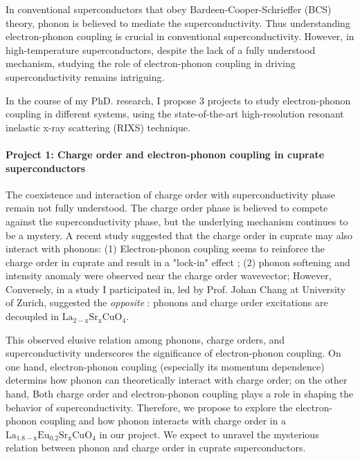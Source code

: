 \documentclass[11pt]{article}
\begin{document}
In conventional superconductors that obey Bardeen-Cooper-Schrieffer (BCS) theory, phonon is believed to mediate the superconductivity\cite{bardeen_theory_1957}. Thus understanding electron-phonon coupling is crucial in conventional superconductivity. However, in high-temperature superconductors, despite the lack of a fully understood mechanism, studying the role of electron-phonon coupling in driving superconductivity remains intriguing.

In the course of my PhD. research, I propose 3 projects to study electron-phonon coupling in different systems, using the state-of-the-art high-resolution resonant inelastic x-ray scattering (RIXS) technique\cite{ament_resonant_2011,zhou_i21_2022}. 

\paragraph{Project 1: Charge order and electron-phonon coupling in cuprate superconductors}
The coexistence and interaction of charge order with superconductivity phase remain not fully understood. The charge order phase is believed to compete against the superconductivity phase\cite{arpaia_charge_2021,comin_resonant_2016,canosa_resonant_2014, hucker_competing_2014, chang_direct_2012,ghiringhelli_long-range_2012}, but the underlying mechanism continues to be a mystery. A recent study suggested that the charge order in cuprate may also interact with phonons: (1) Electron-phonon coupling seems to reinforce the charge order in cuprate and result in a "lock-in" effect \cite{wang_charge_2021}; (2) phonon softening and intensity anomaly were observed near the charge order wavevector\cite{wang_charge_2021,lin_strongly_2020, huang_quantum_2021,miao_incommensurate_2018,tacon_inelastic_2014,li_multiorbital_2020,braicovich_determining_2020,chaix_dispersive_2017,peng_enhanced_2020};  However, Conversely, in a study I participated in, led by Prof. Johan Chang at University of Zurich, suggested the \textit{opposite} : phonons and charge order excitations are decoupled in $\mathrm{La_{2-x}Sr_xCuO_4}$.

This observed elusive relation among phonons, charge orders, and superconductivity underscores the significance of electron-phonon coupling. On one hand, electron-phonon coupling (especially its momentum dependence) determins how phonon can theoretically interact with charge order; on the other hand, Both charge order and electron-phonon coupling plays a role in shaping the behavior of superconductivity. Therefore, we propose to explore the electron-phonon coupling and how phonon interacts with charge order in a $\mathrm{La_{1.8-x}Eu_{0.2}Sr_xCuO_{4}}$ in our project. We expect to unravel the mysterious relation between phonon and charge order in cuprate superconductors. 
\end{document}
